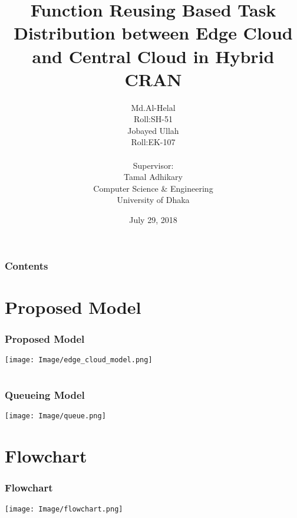 \documentclass[usenames,dvipsnames]{beamer}
\begin{document}
  \title{Function Reusing Based Task Distribution between Edge Cloud and Central Cloud in Hybrid CRAN}
  \author[Md.Al-Helal \& Jobayed Ullah]{
  \parbox{2.5cm}{
\centering Md.Al-Helal\\Roll:SH-51}\hspace{3cm}
\parbox{2.5cm}{
{\centering Jobayed Ullah \\Roll:EK-107}}
\centering \vspace{1cm}\\Supervisor:\\Tamal Adhikary\\\scriptsize{Computer Science \& Engineering\\University of Dhaka}
}

\vspace{1cm}
\date{July 29, 2018}
\begin{frame}
  \maketitle
\end{frame}

\begin{frame}
\frametitle{Contents}
\tableofcontents
\end{frame}
\section{Proposed Model}

\begin{frame}
  \frametitle{Proposed Model}
  \texttt{[image: Image/edge\_cloud\_model.png]}
\end{frame}

\section{}
\begin{frame}
  \frametitle{Queueing Model}
  \begin{center}
  \texttt{[image: Image/queue.png]}
\end{center}
  \end{frame}

\section{Flowchart}
\begin{frame}
  \frametitle{Flowchart}
  \vspace*{-0.9cm}
  \begin{center}
  \texttt{[image: Image/flowchart.png]}
  \end{center}
  \end{frame}
\end{document}
